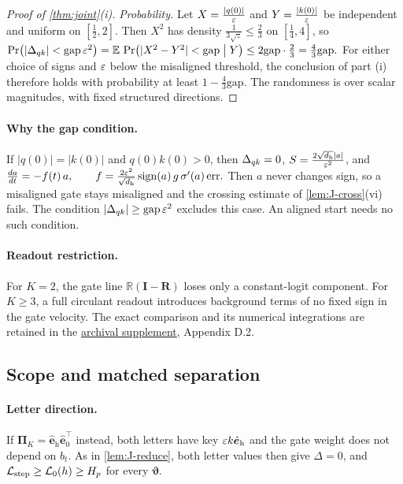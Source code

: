 \begin{proof}[Proof of \cref{thm:joint}(i)]
\emph{Probability.} Let $X=\frac{|q(0)|}{\varepsilon}$ and $Y=\frac{|k(0)|}{\varepsilon}$ be independent and uniform on $[\frac{1}{2},2]$. Then $X^2$ has density
$\frac{1}{3\sqrt z}\le\frac{2}{3}$ on $[\frac{1}{4},4]$, so
 $\Pr\bigl(|\qkbalance|<\mathrm{gap}\,\initscale^2\bigr)=\E\,\Pr\bigl(|X^2-Y^2|<\mathrm{gap}\bigm|Y\bigr)\le2\mathrm{gap}\cdot\tfrac{2}{3}=\tfrac{4}{3}\mathrm{gap} .$ 
For either choice of signs and $\varepsilon$ below the misaligned threshold, the conclusion of part (i) therefore holds with
probability at least $1-\tfrac{4}{3}\mathrm{gap}$. The randomness is over scalar magnitudes, with fixed structured directions.\qedhere
\end{proof}

\paragraph{Why the gap condition.}\label{rem:J-balance} If $|q(0)|=|k(0)|$ and $q(0)k(0)>0$, then $\Delta_{qk}=0$, $S=\frac{2\sqrt{d_{\mathrm h}}|a|}{\varepsilon^2}$, and
 $\ddt{a}=-f(t)\,a,\qquad f=\frac{2\initscale^2}{\sqrt{d_{\mathrm h}}}\operatorname{sign}(a)\,g\,\sigma'(a)\,\mathrm{err} .$ 
Then $a$ never changes sign, so a misaligned gate stays misaligned and the crossing estimate of \cref{lem:J-cross}(vi) fails. The condition
$|\Delta_{qk}|\ge\mathrm{gap}\,\varepsilon^2$ excludes this case. An aligned start needs no such condition.

\paragraph{Readout restriction.}\label{rem:J-line}
For $K=2$, the gate line $\mathbb R(\mathbf I-\mathbf R)$ loses only a constant-logit
component. For $K\ge3$, a full circulant readout introduces background terms of no fixed
sign in the gate velocity. The exact comparison and its numerical integrations are retained
in the \href{archival_full_version.pdf}{archival supplement}, Appendix D.2.





\subsection{Scope and matched separation}
\label{app:step-learning-scope}
\label{app:weak-routing-limitations}


\paragraph{Letter direction.} If $\bm\Pi_K=\hat{\bm e}_{\mathrm h}\hat{\bm e}_0^\top$ instead, both letters have key $\varepsilon k\hat{\bm e}_{\mathrm h}$ and the gate weight does not depend on $b_t$.
As in \cref{lem:J-reduce}, both letter values then give $\Delta=0$, and $\mathcal L_{\mathrm{step}}\ge \mathcal L_0(h)\ge H_p$ for every $\bm\vartheta$.

